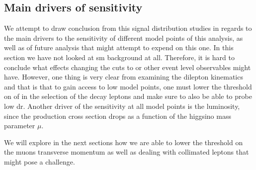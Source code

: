 \subsection{Main drivers of sensitivity}

We attempt to draw conclusion from this signal distribution studies in regards to the main drivers to the sensitivity of different model points of this analysis, as well as of future analysis that might attempt to expend on this one. In this section we have not looked at \gls{sm} background at all. Therefore, it is hard to conclude what effects changing the cuts to \MET or other event level observables might have. However, one thing is very clear from examining the dilepton kinematics and that is that to gain access to low \dm model points, one must lower the threshold on of \pt in the selection of the decay leptons and make sure to also be able to probe low \gls{dr}. Another driver of the sensitivity at all \dm model points is the luminosity, since the production cross section drops as a function of the higgsino mass parameter $\mu$.

We will explore in the next sections how we are able to lower the threshold on the muons transverse momentum as well as dealing with collimated leptons that might pose a challenge. 